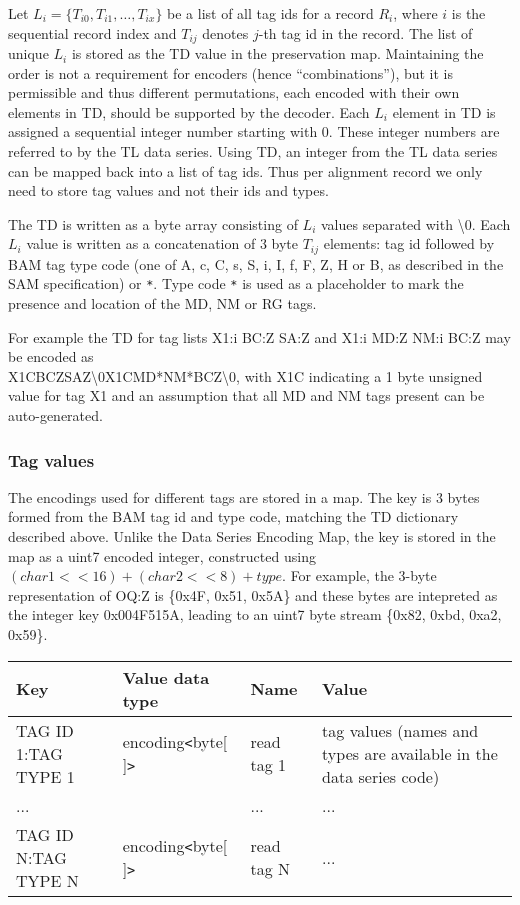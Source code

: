 \documentclass[a4paper]{article}
\begin{document}
Let $L_{i}=\{T_{i0}, T_{i1}, \ldots, T_{ix}\}$ be a list of all tag ids for a record $R_{i}$, where $i$ is the sequential record index and $T_{ij}$ denotes $j$-th tag id in the record.
The list of unique $L_{i}$ is stored as the TD value in the preservation map.
Maintaining the order is not a requirement for encoders (hence ``combinations''), but it is permissible and thus different permutations, each encoded with their own elements in TD, should be supported by the decoder.
Each $L_{i}$ element in TD is assigned a sequential integer number starting with 0.
These integer numbers are referred to by the TL data series.
Using TD, an integer from the TL data series can be mapped back into a list of tag ids.
Thus per alignment record we only need to store tag values and not their ids and types.

The TD is written as a byte array consisting of $L_{i}$ values separated with \textbackslash{}0.
Each $L_{i}$ value is written as a concatenation of 3 byte $T_{ij}$ elements: tag id followed by BAM tag type code (one of A, c, C, s, S, i, I, f, F, Z, H or B, as described in the SAM specification) or \texttt{*}.
Type code \texttt{*} is used as a placeholder to mark the presence and location of the MD, NM or RG tags.

For example the TD for tag lists X1:i BC:Z SA:Z and X1:i MD:Z NM:i BC:Z may be encoded as\\
X1CBCZSAZ\textbackslash{}0X1CMD*NM*BCZ\textbackslash{}0, with X1C indicating a 1 byte unsigned value for tag X1 and an assumption that all MD and NM tags present can be auto-generated.

\subsubsection*{Tag values}

The encodings used for different tags are stored in a map.
The key is 3 bytes formed from the BAM tag id and type code, matching the TD dictionary described above.
Unlike the Data Series Encoding Map, the key is stored in the map as a uint7 encoded integer, constructed using $(char1<<16) + (char2<<8) + type$.
For example, the 3-byte representation of OQ:Z is \{0x4F, 0x51, 0x5A\} and these bytes are intepreted as the integer key 0x004F515A, leading to an uint7 byte stream \{0x82, 0xbd, 0xa2, 0x59\}.

\begin{tabular}{|l|l|l|>{\raggedright}p{160pt}|}
\hline
\textbf{Key} & \textbf{Value data type} & \textbf{Name} & \textbf{Value}
\tabularnewline
\hline
TAG ID 1:TAG TYPE 1 & encoding\texttt{<}byte[ ]\texttt{>} & read tag 1 & tag values
(names and types are available in the data series code)\tabularnewline
\hline
... &  & ... & ...\tabularnewline
\hline
TAG ID N:TAG TYPE N & encoding\texttt{<}byte[ ]\texttt{>} & read tag N & ...\tabularnewline
\hline
\end{tabular}
\end{document}
